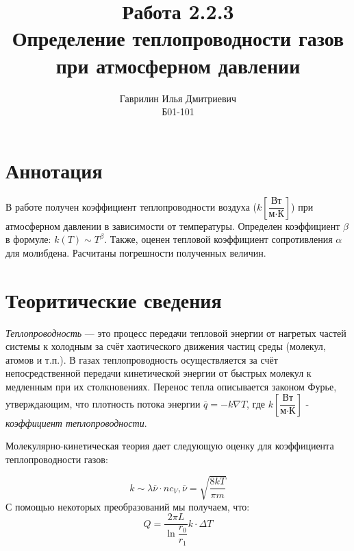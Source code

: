 \documentclass[a4paper, 12pt]{article}%
\author{Гаврилин Илья Дмитриевич \\
	Б01-101}
\title{\textbf{Работа 2.2.3 \\ 
		Определение теплопроводности газов	\\при атмосферном давлении}}
\begin{document}
	\maketitle
	\section{Аннотация}
	В работе получен коэффициент теплопроводности воздуха ($k \left[ \dfrac{\text{Вт}}{\text{м} \cdot \text{К}} \right]$) при атмосферном давлении в зависимости от температуры. Определен коэффициент $\beta$ в формуле: $k(T)\sim T^{\beta}$. Также, оценен тепловой коэффициент сопротивления $\alpha$ для молибдена. Расчитаны погрешности полученных величин.
	\section{Теоритические сведения}
	\textit{Теплопроводность} — это процесс передачи тепловой энергии от нагретых частей системы к холодным за счёт хаотического движения частиц среды (молекул, атомов и т.п.). В газах теплопроводность осуществляется за счёт  непосредственной передачи кинетической энергии от быстрых молекул к медленным при их столкновениях. Перенос тепла описывается законом Фурье, утверждающим, что плотность потока энергии $\overline{q} = -k \nabla T$, где $k \left[ \dfrac{\text{Вт}}{\text{м} \cdot \text{К}} \right]$ - \textit{коэффициент теплопроводности}.
	
	Молекулярно-кинетическая теория дает следующую оценку для коэффициента теплопроводности газов: 
	
	\begin{equation} 
		k \sim \lambda \overline{\nu} \cdot n c_V, \overline{\nu} = \sqrt{\frac{8kT}{\pi m}}
	\end{equation}
	С помощью некоторых преобразований мы получаем, что: 
	\begin{equation} 
		Q = \dfrac{2 \pi L}{\ln \dfrac{r_0}{r_1}} k  \cdot \Delta T 
	\end{equation}
\end{document}
